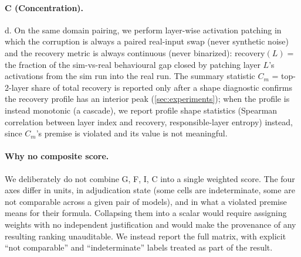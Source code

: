 \paragraph{C (Concentration).}
d. On the same domain pairing, we perform layer-wise activation
patching in which the
corruption is always a paired real-input swap (never synthetic noise) and the recovery
metric is always continuous (never binarized):
$\mathrm{recovery}(L) = $ the fraction of the sim-vs-real behavioural gap closed by
patching layer $L$'s activations from the sim run into the real run. The summary
statistic $C_m$ = top-2-layer share of total recovery is reported only after a shape
diagnostic confirms the recovery profile has an interior peak (\cref{sec:experiments});
when the profile is instead monotonic (a cascade), we report profile shape statistics
(Spearman correlation between layer index and recovery, responsible-layer entropy)
instead, since $C_m$'s premise is violated and its value is not meaningful.

\paragraph{Why no composite score.}
We deliberately do not combine G, F, I, C into a single weighted score. The four axes
differ in units, in adjudication state (some cells are indeterminate, some are not
comparable across a given pair of models), and in what a violated premise means for
their formula. Collapsing them into a scalar would require assigning weights with no
independent justification and would make the provenance of any resulting ranking
unauditable. We instead report the full matrix, with explicit ``not comparable'' and
``indeterminate'' labels treated as part of the result.
